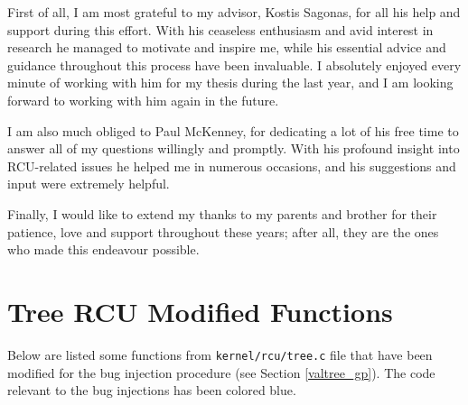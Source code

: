 \documentclass[diploma, english]{softlab-thesis}
\theoremstyle{definition}
\newcommand{\ccode}[1]{\lstset{language=C}\protect\lstinline!#1!}
\begin{document}
\begin{acknowledgementsen}
  First of all, I am most grateful to my advisor, Kostis Sagonas, for all his help
  and support during this effort. With his ceaseless enthusiasm and avid interest
  in research he managed to motivate and inspire me, while his essential advice
  and guidance throughout this process have been invaluable. I absolutely enjoyed
  every minute of working with him for my thesis during the last year,
  and I am looking forward to working with him again in the future.

  I am also much obliged to Paul McKenney, for dedicating a lot of his free time
  to answer all of my questions willingly and promptly. With his 
  profound insight into RCU-related issues he helped me in numerous occasions,
  and his suggestions and input were extremely helpful.

  Finally, I would like to extend my thanks to my parents and brother for
  their patience, love and support throughout these years; after all, they are
  the ones who made this endeavour possible.
  
\end{acknowledgementsen}


\tableofcontents
\listoffigures
\listoflistings



\mainmatter








\nocite{*}







\backmatter

\appendix

\chapter{Tree RCU Modified Functions \label{appendix_a}}

Below are listed some functions from \ccode{kernel/rcu/tree.c} file
that have been modified for the bug injection procedure (see Section
\ref{valtree_gp}). The code relevant to the bug injections has been
colored blue.

%
\end{document}
